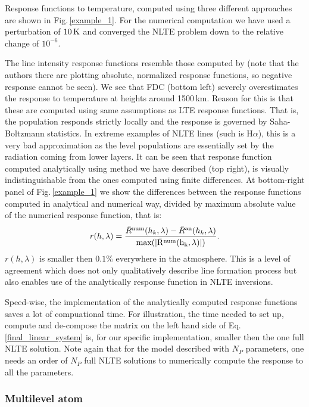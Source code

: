 \documentclass[referee]{aa}
\begin{document}
Response functions to temperature, computed using three different approaches are shown in Fig.\,\ref{example_1}. For the numerical computation we have used a perturbation of $10\,\rm{K}$ and converged the NLTE problem down to the relative change of $10^{-6}$. 

The line intensity response functions resemble those computed by \citet{Hector_halpha} (note that the authors there are plotting absolute, normalized response functions, so negative response cannot be seen). We see that FDC (bottom left) severely overestimates the response to temperature at heights around 1500\,km. Reason for this is that these are computed using same assumptions as LTE response functions. That is, the population responds strictly locally and the response is governed by Saha-Boltzmann statistics. In extreme examples of NLTE lines (such is H$\alpha$), this is a very bad approximation as the level populations are essentially set by the radiation coming from lower layers. It can be seen that response function computed analytically using method we have described (top right), is visually indistinguishable from the ones computed using finite differences. At bottom-right panel of Fig.\,\ref{example_1} we show the differences between the response functions computed in analytical and numerical way, divided by maximum absolute value of the numerical response function, that is:
\begin{equation}
r(h,\lambda) = \frac{\bar{R}^{\rm num}(h_k,\lambda) - \bar{R}^{\rm an}(h_k,\lambda)}{\rm max (|\bar{R}^{\rm num}(h_k,\lambda)|)}.
\end{equation}
$r(h,\lambda)$ is smaller then $0.1\%$ everywhere in the atmosphere. This is a level of agreement which does not only qualitatively describe line formation process but also enables use of the analytically response function in NLTE inversions. 

Speed-wise, the implementation of the analytically computed response functions saves a lot of compuational time. For illustration, the time needed to set up, compute and de-compose the matrix on the left hand side of Eq.\,\ref{final_linear_system} is, for our specific implementation, smaller then the one full NLTE solution. Note again that for the model described with $N_P$ parameters, one needs an order of $N_P$ full NLTE solutions to numerically compute the response to all the parameters.


\subsubsection{Multilevel atom}
\end{document}
